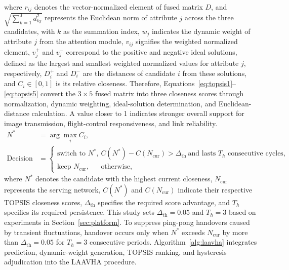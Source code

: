 \documentclass[final,3p,times,twocolumn]{elsarticle}
\begin{document}
where $r_{ij}$ denotes the vector-normalized element of fused matrix $D$, and $\sqrt{\sum_{k=1}^{3}d_{kj}^{2}}$ represents the Euclidean norm of attribute $j$ across the three candidates, with $k$ as the summation index, $w_j$ indicates the dynamic weight of attribute $j$ from the attention module, $v_{ij}$ signifies the weighted normalized element, $v_j^+$ and $v_j^-$ correspond to the positive and negative ideal solutions, defined as the largest and smallest weighted normalized values for attribute $j$, respectively, $D_i^+$ and $D_i^-$ are the distances of candidate $i$ from these solutions, and $C_i\in[0,1]$ is its relative closeness. Therefore, Equations~\eqref{eq:topsis1}--\eqref{eq:topsis5} convert the $3\times5$ fused matrix into three closeness scores through normalization, dynamic weighting, ideal-solution determination, and Euclidean-distance calculation. A value closer to 1 indicates stronger overall support for image transmission, flight-control responsiveness, and link reliability.
\begin{align}
N^* &= \arg\max_i C_i, \label{eq:select}\\
\mathrm{Decision} &=
\begin{cases}
\text{switch to }N^*, & C(N^*)-C(N_{\mathrm{cur}})>\Delta_{\mathrm{th}}\ \text{and lasts }T_h\text{ consecutive cycles},\\
\text{keep }N_{\mathrm{cur}}, & \text{otherwise},
\end{cases} \label{eq:hysteresis}
\end{align}
where $N^*$ denotes the candidate with the highest current closeness, $N_{\mathrm{cur}}$ represents the serving network, $C(N^*)$ and $C(N_{\mathrm{cur}})$ indicate their respective TOPSIS closeness scores, $\Delta_{\mathrm{th}}$ specifies the required score advantage, and $T_h$ specifies its required persistence. This study sets $\Delta_{\mathrm{th}}=0.05$ and $T_h=3$ based on experiments in Section~\ref{sec:platform}. To suppress ping-pong handovers caused by transient fluctuations, handover occurs only when $N^*$ exceeds $N_{\mathrm{cur}}$ by more than $\Delta_{\mathrm{th}}=0.05$ for $T_h=3$ consecutive periods. Algorithm~\ref{alg:laavha} integrates prediction, dynamic-weight generation, TOPSIS ranking, and hysteresis adjudication into the LAAVHA procedure.
\end{document}
